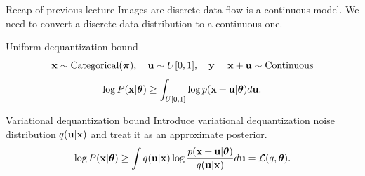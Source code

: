 \begin{frame}{Recap of previous lecture}
	Images are discrete data flow is a continuous model.
	We need to convert a discrete data distribution to a continuous one.
	
	\begin{block}{Uniform dequantization bound}
		\vspace{-0.5cm}
		\[
			\mathbf{x} \sim \text{Categorical}(\boldsymbol{\pi}), \quad 
			\mathbf{u} \sim U[0, 1], \quad 
			\mathbf{y} = \mathbf{x} + \mathbf{u} \sim \text{Continuous} 
		\]
		\vspace{-0.4cm}
		\[
			\log P(\mathbf{x} | \boldsymbol{\theta}) \geq \int_{U[0, 1]} \log p(\mathbf{x} + \mathbf{u} | \boldsymbol{\theta}) d \mathbf{u}.
		\]
	\end{block}
	\vspace{-0.2cm}
	\begin{block}{Variational dequantization bound}
		Introduce variational dequantization noise distribution $q(\mathbf{u} | \mathbf{x})$ and treat it as an approximate posterior. 
		\vspace{-0.2cm}
		\[
			\log P(\mathbf{x} | \boldsymbol{\theta}) \geq  \int q(\mathbf{u} | \mathbf{x}) \log \frac{p(\mathbf{x} + \mathbf{u} | \boldsymbol{\theta})}{q(\mathbf{u} | \mathbf{x})} d \mathbf{u} = \mathcal{L}(q, \boldsymbol{\theta}).
		\]
	\end{block}
\end{frame}
